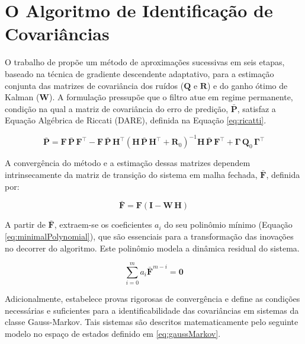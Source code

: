 \documentclass[journal]{IEEEtran}
\begin{document}
\section{O Algoritmo de Identificação de Covariâncias}
\label{sec:algoritmum}
O trabalho de \cite{zhang2020} propõe um método de aproximações sucessivas em seis etapas, baseado na técnica de gradiente descendente adaptativo, para a estimação conjunta das matrizes de covariância dos ruídos ($\mathbf{Q}$ e $\mathbf{R}$) e do ganho ótimo de Kalman ($\mathbf{W}$). A formulação pressupõe que o filtro atue em regime permanente, condição na qual a matriz de covariância do erro de predição, $\bar{\mathbf{P}}$, satisfaz a Equação Algébrica de Riccati (DARE), definida na Equação \ref{eq:ricatti}.

\begin{equation}
    \label{eq:ricatti}
    \bar{\mathbf{P}} = \mathbf{F}\,\bar{\mathbf{P}}\,\mathbf{F}^\top - \mathbf{F}\,\bar{\mathbf{P}}\,\mathbf{H}^\top \left( \mathbf{H}\,\bar{\mathbf{P}}\,\mathbf{H}^\top + \mathbf{R}_0 \right)^{-1} \mathbf{H}\,\bar{\mathbf{P}}\,\mathbf{F}^\top + \mathbf{\Gamma}\,\mathbf{Q}_0\,\mathbf{\Gamma}^\top
\end{equation}

A convergência do método e a estimação dessas matrizes dependem intrinsecamente da matriz de transição do sistema em malha fechada, $\bar{\mathbf{F}}$, definida por:

\begin{equation}
    \label{eq:closeloopeq}
    \bar{\mathbf{F}} = \mathbf{F}(\mathbf{I} - \mathbf{W}\,\mathbf{H})
\end{equation}

A partir de $\bar{\mathbf{F}}$, extraem-se os coeficientes $a_i$ do seu polinômio mínimo (Equação \eqref{eq:minimalPolynomial}), que são essenciais para a transformação das inovações no decorrer do algoritmo. Este polinômio modela a dinâmica residual do sistema.

\begin{equation}
    \label{eq:minimalPolynomial}
    \sum_{i=0}^m a_i \bar{\mathbf{F}}^{m-i} = \mathbf{0}
\end{equation}

Adicionalmente, \cite{zhang2020} estabelece provas rigorosas de convergência e define as condições necessárias e suficientes para a identificabilidade das covariâncias em sistemas da classe Gauss-Markov. Tais sistemas são descritos matematicamente pelo seguinte modelo no espaço de estados definido em \ref{eq:gaussMarkov}.
\end{document}
